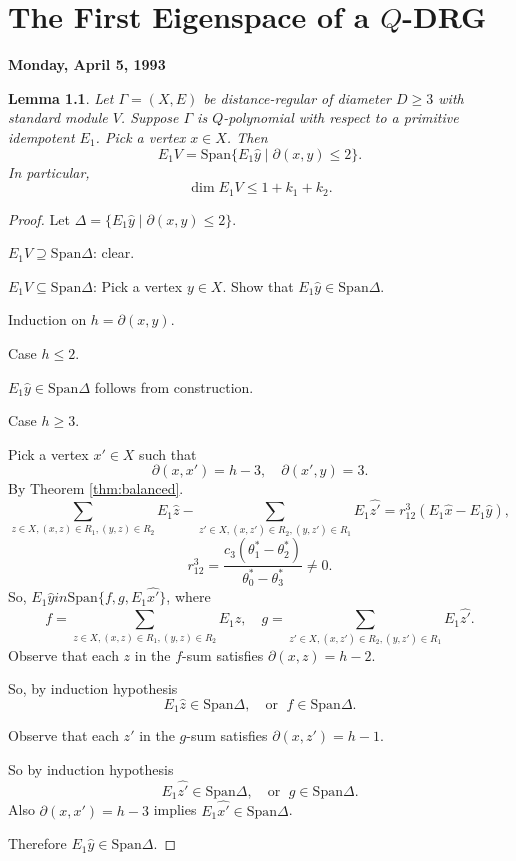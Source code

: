 \documentclass[
]{book}
\newtheorem{lemma}{Lemma}[chapter]
\theoremstyle{definition}
\theoremstyle{definition}
\theoremstyle{definition}
\theoremstyle{definition}
\theoremstyle{remark}
\begin{document}
\hypertarget{lec28}{%
\chapter{\texorpdfstring{The First Eigenspace of a \(Q\)-DRG}{The First Eigenspace of a Q-DRG}}\label{lec28}}

\textbf{Monday, April 5, 1993}

\begin{lemma}
\protect\hypertarget{lem:EV}{}\label{lem:EV}Let \(\Gamma = (X,E)\) be distance-regular of diameter \(D\geq 3\) with standard module \(V\). Suppose \(\Gamma\) is \(Q\)-polynomial with respect to a primitive idempotent \(E_1\). Pick a vertex \(x\in X\). Then
\[E_1V = \mathrm{Span}\{E_1\hat{y}\mid \partial(x,y)\leq 2\}.\]
In particular,
\[\dim E_1V \leq 1 + k_1 + k_2.\]
\end{lemma}

\begin{proof}
Let \(\Delta = \{E_1\hat{y}\mid \partial(x,y)\leq 2\}\).

\(E_1V \supseteq \mathrm{Span}\Delta\): clear.

\(E_1V \subseteq \mathrm{Span}\Delta\): Pick a vertex \(y\in X\). Show that \(E_1\hat{y}\in \mathrm{Span}\Delta\).

Induction on \(h = \partial(x,y)\).

Case \(h\leq 2\).

\(E_1\hat{y} \in \mathrm{Span}\Delta\) follows from construction.

Case \(h\geq 3\).

Pick a vertex \(x'\in X\) such that
\[\partial(x,x') = h-3, \quad \partial(x',y) = 3.\]
By Theorem \ref{thm:balanced}.
\[\sum_{z\in X, (x,z)\in R_1, (y,z)\in R_2}E_1\hat{z} - \sum_{z'\in X, (x,z')\in R_2, (y,z')\in R_1}E_1\hat{z'} = r^3_{12}(E_1\hat{x}-E_1\hat{y}),\]
\[r^3_{12} = \frac{c_3(\theta^*_1-\theta^*_2)}{\theta^*_0-\theta^*_3} \neq 0.\]
So, \(E_1\hat{y}in \mathrm{Span}\{f, g, E_1\hat{x'}\}\), where
\[f = \sum_{z\in X, (x,z)\in R_1, (y,z)\in R_2}E_1\hat{z}, \quad g = \sum_{z'\in X, (x,z')\in R_2, (y,z')\in R_1}E_1\hat{z'}.\]
Observe that each \(z\) in the \(f\)-sum satisfies \(\partial(x,z)=h-2\).

So, by induction hypothesis
\[E_1\hat{z}\in \mathrm{Span}\Delta, \quad \text{or }\; f\in \mathrm{Span}\Delta.\]

Observe that each \(z'\) in the \(g\)-sum satisfies \(\partial(x,z')=h-1\).

So by induction hypothesis
\[E_1\hat{z'}\in \mathrm{Span}\Delta, \quad \text{or }\; g\in \mathrm{Span}\Delta.\]
Also \(\partial(x,x') = h-3\) implies \(E_1\hat{x'}\in \mathrm{Span}\Delta\).

Therefore \(E_1\hat{y} \in \mathrm{Span}\Delta\).
\end{proof}
\end{document}
